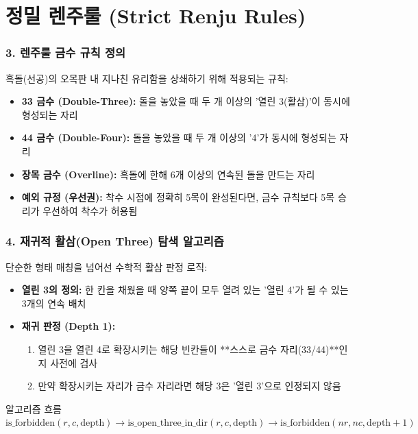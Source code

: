 \documentclass{beamer}
\begin{document}
\section{정밀 렌주룰 (Strict Renju Rules)}
\begin{frame}
\frametitle{3. 렌주룰 금수 규칙 정의}
흑돌(선공)의 오목판 내 지나친 유리함을 상쇄하기 위해 적용되는 규칙:
\begin{itemize}
    \item \textbf{33 금수 (Double-Three):} 돌을 놓았을 때 두 개 이상의 '열린 3(활삼)'이 동시에 형성되는 자리
    \item \textbf{44 금수 (Double-Four):} 돌을 놓았을 때 두 개 이상의 '4'가 동시에 형성되는 자리
    \item \textbf{장목 금수 (Overline):} 흑돌에 한해 6개 이상의 연속된 돌을 만드는 자리
    \item \textbf{예외 규정 (우선권):} 착수 시점에 정확히 5목이 완성된다면, 금수 규칙보다 5목 승리가 우선하여 착수가 허용됨
\end{itemize}
\end{frame}

\begin{frame}
\frametitle{4. 재귀적 활삼(Open Three) 탐색 알고리즘}
단순한 형태 매칭을 넘어선 수학적 활삼 판정 로직:
\begin{itemize}
    \item \textbf{열린 3의 정의:} 한 칸을 채웠을 때 양쪽 끝이 모두 열려 있는 '열린 4'가 될 수 있는 3개의 연속 배치
    \item \textbf{재귀 판정 (Depth 1):} 
    \begin{enumerate}
        \item 열린 3을 열린 4로 확장시키는 해당 빈칸들이 **스스로 금수 자리(33/44)**인지 사전에 검사
        \item 만약 확장시키는 자리가 금수 자리라면 해당 3은 '열린 3'으로 인정되지 않음
    \end{enumerate}
\end{itemize}
\begin{block}{알고리즘 흐름}
    $\text{is\_forbidden}(r, c, \text{depth}) \rightarrow \text{is\_open\_three\_in\_dir}(r, c, \text{depth}) \rightarrow \text{is\_forbidden}(nr, nc, \text{depth}+1)$
\end{block}
\end{frame}
\end{document}
